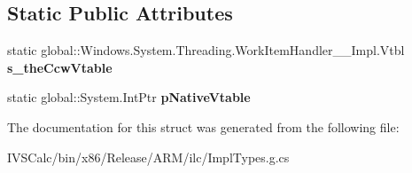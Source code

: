 \subsection*{Static Public Attributes}
\begin{DoxyCompactItemize}
\item 
\mbox{\label{struct_windows_1_1_system_1_1_threading_1_1_work_item_handler_____impl_1_1_vtbl_a55e6006f98db21e2d527799b05de81c9}} 
static global\+::\+Windows.\+System.\+Threading.\+Work\+Item\+Handler\+\_\+\+\_\+\+Impl.\+Vtbl {\bfseries s\+\_\+the\+Ccw\+Vtable}
\item 
\mbox{\label{struct_windows_1_1_system_1_1_threading_1_1_work_item_handler_____impl_1_1_vtbl_a8c7da921085ec1dd4f19702d597f69c9}} 
static global\+::\+System.\+Int\+Ptr {\bfseries p\+Native\+Vtable}
\end{DoxyCompactItemize}


The documentation for this struct was generated from the following file\+:\begin{DoxyCompactItemize}
\item 
I\+V\+S\+Calc/bin/x86/\+Release/\+A\+R\+M/ilc/Impl\+Types.\+g.\+cs\end{DoxyCompactItemize}
